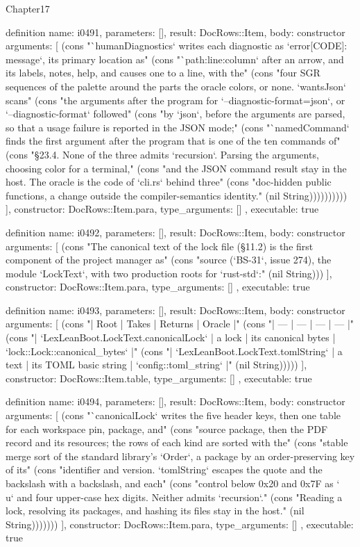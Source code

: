 \begin{lexlean}{Chapter17}
\begin{semanticmodule}
definition{
  name: i0491,
  parameters: [],
  result: DocRows::Item,
  body: constructor{
    arguments: [
      (cons "`humanDiagnostics` writes each diagnostic as `error[CODE]: message`, its primary location as" (cons "`path:line:column` after an arrow, and its labels, notes, help, and causes one to a line, with the" (cons "four SGR sequences of the palette around the parts the oracle colors, or none. `wantsJson` scans" (cons "the arguments after the program for `--diagnostic-format=json`, or `--diagnostic-format` followed" (cons "by `json`, before the arguments are parsed, so that a usage failure is reported in the JSON mode;" (cons "`namedCommand` finds the first argument after the program that is one of the ten commands of" (cons "§23.4. None of the three admits `recursion`. Parsing the arguments, choosing color for a terminal," (cons "and the JSON command result stay in the host. The oracle is the code of `cli.rs` behind three" (cons "doc-hidden public functions, a change outside the compiler-semantics identity." (nil String))))))))))
    ],
    constructor: DocRows::Item.para,
    type_arguments: []
  },
  executable: true
}

definition{
  name: i0492,
  parameters: [],
  result: DocRows::Item,
  body: constructor{
    arguments: [
      (cons "The canonical text of the lock file (§11.2) is the first component of the project manager as" (cons "source (`BS-31`, issue 274), the module `LockText`, with two production roots for `rust-std`:" (nil String)))
    ],
    constructor: DocRows::Item.para,
    type_arguments: []
  },
  executable: true
}

definition{
  name: i0493,
  parameters: [],
  result: DocRows::Item,
  body: constructor{
    arguments: [
      (cons "| Root | Takes | Returns | Oracle |" (cons "| --- | --- | --- | --- |" (cons "| `LexLeanBoot.LockText.canonicalLock` | a lock | its canonical bytes | `lock::Lock::canonical_bytes` |" (cons "| `LexLeanBoot.LockText.tomlString` | a text | its TOML basic string | `config::toml_string` |" (nil String)))))
    ],
    constructor: DocRows::Item.table,
    type_arguments: []
  },
  executable: true
}

definition{
  name: i0494,
  parameters: [],
  result: DocRows::Item,
  body: constructor{
    arguments: [
      (cons "`canonicalLock` writes the five header keys, then one table for each workspace pin, package, and" (cons "source package, then the PDF record and its resources; the rows of each kind are sorted with the" (cons "stable merge sort of the standard library's `Order`, a package by an order-preserving key of its" (cons "identifier and version. `tomlString` escapes the quote and the backslash with a backslash, and each" (cons "control below 0x20 and 0x7F as `\\u` and four upper-case hex digits. Neither admits `recursion`." (cons "Reading a lock, resolving its packages, and hashing its files stay in the host." (nil String)))))))
    ],
    constructor: DocRows::Item.para,
    type_arguments: []
  },
  executable: true
}


\end{semanticmodule}
\end{lexlean}

